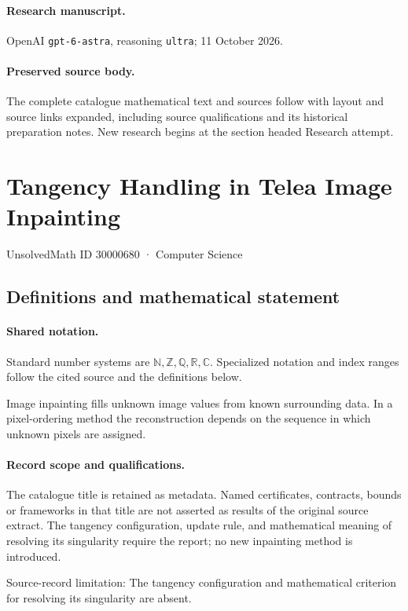 \documentclass[11pt]{article}
\begin{document}
\paragraph{Research manuscript.} OpenAI \texttt{gpt-6-astra}, reasoning \texttt{ultra}; 11 October 2026.
\paragraph{Preserved source body.} The complete catalogue mathematical text and sources follow with layout and source links expanded, including source qualifications and its historical preparation notes. New research begins at the section headed Research attempt.

\section{Tangency Handling in Telea Image Inpainting}\label{30000680}
{\small UnsolvedMath ID 30000680 · Computer Science}
\subsection{Definitions and mathematical statement}

\paragraph{Shared notation.}Standard number systems are $\mathbb N,\mathbb Z,\mathbb Q,\mathbb R,\mathbb C$. Specialized notation and index ranges follow the cited source and the definitions below.


Image inpainting fills unknown image values from known surrounding data. In a pixel-ordering method the reconstruction depends on the sequence in which unknown pixels are assigned.
\paragraph{Record scope and qualifications.}
The catalogue title is retained as metadata. Named certificates, contracts, bounds or frameworks in that title are not asserted as results of the original source extract.
The tangency configuration, update rule, and mathematical meaning of resolving its singularity require the report; no new inpainting method is introduced.

Source-record limitation: The tangency configuration and mathematical criterion for resolving its singularity are absent.
\end{document}
